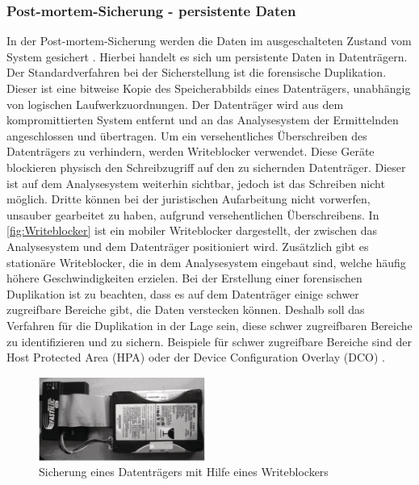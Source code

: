 \documentclass[12pt,DIV=14, version=first, BCOR=10mm,a4paper,twoside,parskip=half-,headsepline,headinclude]{scrartcl}
\begin{document}
	    \subsubsection{Post-mortem-Sicherung - persistente Daten}
	    In der Post-mortem-Sicherung werden die Daten im ausgeschalteten Zustand vom System gesichert \cite[vgl. S. 30]{texbook03}. Hierbei handelt es sich um persistente Daten in Datenträgern. Der Standardverfahren bei der Sicherstellung ist die forensische Duplikation. Dieser ist eine bitweise Kopie des Speicherabbilds eines Datenträgers, unabhängig von logischen Laufwerkzuordnungen. Der Datenträger wird aus dem kompromittierten System entfernt und an das Analysesystem der Ermittelnden angeschlossen und übertragen. Um ein versehentliches Überschreiben des Datenträgers zu verhindern, werden Writeblocker verwendet. Diese Geräte blockieren physisch den Schreibzugriff auf den zu sichernden Datenträger. Dieser ist auf dem Analysesystem weiterhin sichtbar, jedoch ist das Schreiben nicht möglich. Dritte können bei der juristischen Aufarbeitung nicht vorwerfen, unsauber gearbeitet zu haben, aufgrund versehentlichen Überschreibens. In \autoref{fig:Writeblocker} ist ein mobiler Writeblocker dargestellt, der zwischen das Analysesystem und dem Datenträger positioniert wird. Zusätzlich gibt es stationäre Writeblocker, die in dem Analysesystem eingebaut sind, welche häufig höhere Geschwindigkeiten erzielen. Bei der Erstellung einer forensischen Duplikation ist zu beachten, dass es auf dem Datenträger einige schwer zugreifbare Bereiche gibt, die Daten verstecken können. Deshalb soll das Verfahren für die Duplikation in der Lage sein, diese schwer zugreifbaren Bereiche zu identifizieren und zu sichern. Beispiele für schwer zugreifbare Bereiche sind der Host Protected Area (HPA) oder der Device Configuration Overlay (DCO) \cite[vgl. S. 26]{BSI-leitfaden2011}.
        \begin{figure}[h] 
    		\centering %
    		\includegraphics[width=0.485\textwidth]{bilder/Writeblocker.PNG}
    		\caption{Sicherung eines Datenträgers mit Hilfe eines Writeblockers \cite[S. 92]{texbook01}}
    	    \label{fig:Writeblocker}
	    \end{figure}
	    
\end{document}
